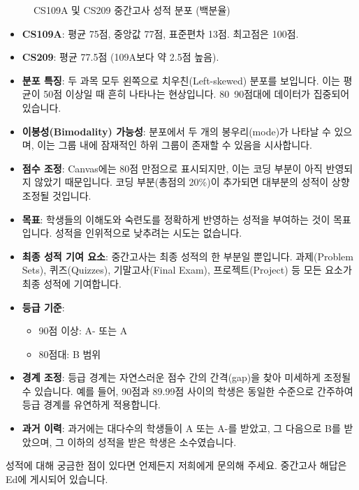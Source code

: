 \documentclass[11pt,a4paper]{book}
\theoremstyle{definition}
\begin{document}
\begin{figure}[h!]
    \centering
    \caption{CS109A 및 CS209 중간고사 성적 분포 (백분율)}
    \label{fig:midterm_grades}
\end{figure}

\begin{infobox}[title=중간고사 성적 요약]
\begin{itemize}
    \item \textbf{CS109A}: 평균 75점, 중앙값 77점, 표준편차 13점. 최고점은 100점.
    \item \textbf{CS209}: 평균 77.5점 (109A보다 약 2.5점 높음).
    \item \textbf{분포 특징}: 두 과목 모두 왼쪽으로 치우친(Left-skewed) 분포를 보입니다. 이는 평균이 50점 이상일 때 흔히 나타나는 현상입니다. 80~90점대에 데이터가 집중되어 있습니다.
    \item \textbf{이봉성(Bimodality) 가능성}: 분포에서 두 개의 봉우리(mode)가 나타날 수 있으며, 이는 그룹 내에 잠재적인 하위 그룹이 존재할 수 있음을 시사합니다.
    \item \textbf{점수 조정}: Canvas에는 80점 만점으로 표시되지만, 이는 코딩 부분이 아직 반영되지 않았기 때문입니다. 코딩 부분(총점의 20\%)이 추가되면 대부분의 성적이 상향 조정될 것입니다.
\end{itemize}
\end{infobox}

\begin{infobox}[title=성적 평가 철학]
\begin{itemize}
    \item \textbf{목표}: 학생들의 이해도와 숙련도를 정확하게 반영하는 성적을 부여하는 것이 목표입니다. 성적을 인위적으로 낮추려는 시도는 없습니다.
    \item \textbf{최종 성적 기여 요소}: 중간고사는 최종 성적의 한 부분일 뿐입니다. 과제(Problem Sets), 퀴즈(Quizzes), 기말고사(Final Exam), 프로젝트(Project) 등 모든 요소가 최종 성적에 기여합니다.
    \item \textbf{등급 기준}:
    \begin{itemize}
        \item 90점 이상: A- 또는 A
        \item 80점대: B 범위
    \end{itemize}
    \item \textbf{경계 조정}: 등급 경계는 자연스러운 점수 간의 간격(gap)을 찾아 미세하게 조정될 수 있습니다. 예를 들어, 90점과 89.99점 사이의 학생은 동일한 수준으로 간주하여 등급 경계를 유연하게 적용합니다.
    \item \textbf{과거 이력}: 과거에는 대다수의 학생들이 A 또는 A-를 받았고, 그 다음으로 B를 받았으며, 그 이하의 성적을 받은 학생은 소수였습니다.
\end{itemize}
성적에 대해 궁금한 점이 있다면 언제든지 저희에게 문의해 주세요. 중간고사 해답은 Ed에 게시되어 있습니다.
\end{infobox}
\end{document}
